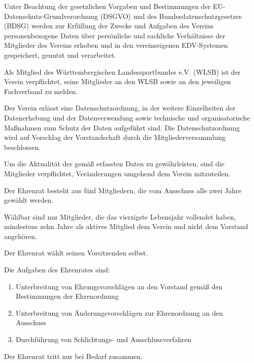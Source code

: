 \documentclass[10pt,a4paper,parskip=half]{scrartcl}
\begin{document}
\begin{contract}
    \label{C:Datenschutz}
    Unter Beachtung der gesetzlichen Vorgaben und Bestimmungen der EU-Datenschutz-Grundverordnung (DSGVO) und des Bundesdatenschutzgesetzes (BDSG) werden zur Erfüllung der Zwecke und Aufgaben des Vereins personenbezogene Daten über persönliche und sachliche Verhältnisse der Mitglieder des Vereins erhoben und in den vereinseigenen EDV-Systemen gespeichert, genutzt und verarbeitet. \label{S:Datenschutz}

    Als Mitglied des Württembergischen Landessportbundes e.V. (WLSB) ist der Verein verpflichtet, seine Mitglieder an den WLSB sowie an den jeweiligen Fachverband zu melden.
    
    Der Verein erlässt eine Datenschutzordnung, in der weitere Einzelheiten der Datenerhebung und der Datenverwendung sowie technische und organisatorische Maßnahmen zum Schutz der Daten aufgeführt sind. Die Datenschutzordnung wird auf Vorschlag der Vorstandschaft durch die Mitgliederversammlung beschlossen.
    
    Um die Aktualität der gemäß  erfassten Daten zu gewährleisten,
    sind die Mitglieder verpflichtet, Veränderungen umgehend dem Verein mitzuteilen.

    Der Ehrenrat besteht aus fünf Mitgliedern, die vom Ausschuss alle zwei Jahre gewählt werden.

    Wählbar sind nur Mitglieder, die das vierzigste Lebensjahr vollendet haben, mindestens zehn Jahre als aktives Mitglied dem Verein und nicht dem Vorstand angehören.

    Der Ehrenrat wählt seinen Vorsitzenden selbst.

    Die Aufgaben des Ehrenrates sind:

    \begin{enumerate}[label=\alph*),noitemsep]
      \item Unterbreitung von Ehrungsvorschlägen an den Vorstand gemäß den Bestimmungen der Ehrenordnung
      \item Unterbreitung von Änderungsvorschlägen zur Ehrenordnung an den Ausschuss
      \item Durchführung von Schlichtungs- und Ausschlussverfahren
    \end{enumerate}

    Der Ehrenrat tritt nur bei Bedarf zusammen.
    
\end{contract}
\end{document}
